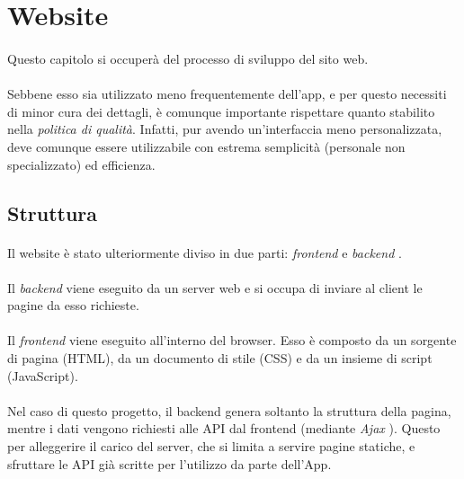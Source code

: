 \documentclass[11pt,a4paper,english]{article}
\begin{document}
\newpage
\section{Website}

\paragraph{} Questo capitolo si occuperà del processo di sviluppo del sito web. 

\paragraph{} Sebbene esso sia utilizzato meno frequentemente dell'app, e per questo necessiti di minor cura dei dettagli, è comunque importante rispettare quanto stabilito nella \emph{politica di qualità}. Infatti, pur avendo un'interfaccia meno personalizzata, deve comunque essere utilizzabile con estrema semplicità (personale non specializzato) ed efficienza.

\subsection{Struttura}

\paragraph{} Il website è stato ulteriormente diviso in due parti: \emph{frontend} e \emph{backend} \cite{frontend_vs_backend}. 

\paragraph{} Il \emph{backend} viene eseguito da un server web e si occupa di inviare al client le pagine da esso richieste. 

\paragraph{} Il \emph{frontend} viene eseguito all'interno del browser. Esso è composto da un sorgente di pagina (HTML), da un documento di stile (CSS) e da un insieme di script (JavaScript). 

\paragraph{} Nel caso di questo progetto, il backend genera soltanto la struttura della pagina, mentre i dati vengono richiesti alle API dal frontend (mediante \emph{Ajax} \cite{ajax}). Questo per alleggerire il carico del server, che si limita a servire pagine statiche, e sfruttare le API già scritte per l'utilizzo da parte dell'App. 
\end{document}

